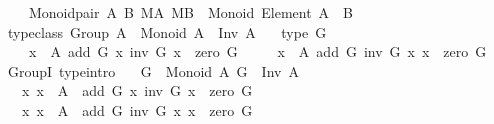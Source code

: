 \begin{isabellebody}
\ \ \ \ Monoid{\isacharunderscore}{\kern0pt}pair\ A\ B\ MA\ MB\ {\isacharcolon}{\kern0pt}\ Monoid\ {\isacharparenleft}{\kern0pt}Element\ {\isacharparenleft}{\kern0pt}A\ {\isasymtimes}\ B{\isacharparenright}{\kern0pt}{\isacharparenright}{\kern0pt}{\isachardoublequoteclose}\isanewline
%
\isadelimproof
%
\endisadelimproof
%
\isatagproof
{}\isamarkupfalse%
%
\endisatagproof
{\isafoldproof}%
%
\isadelimproof
%
\endisadelimproof
%
\isadelimdocument
%
\endisadelimdocument
%
\isatagdocument
%
\isamarkuptrue%
%
\endisatagdocument
{\isafolddocument}%
%
\isadelimdocument
%
\endisadelimdocument
{}\isamarkupfalse%
\ {\isacharbrackleft}{\kern0pt}typeclass{\isacharbrackright}{\kern0pt}{\isacharcolon}{\kern0pt}\ {\isachardoublequoteopen}Group\ A\ {\isasymequiv}\ Monoid\ A\ {\isacharampersand}{\kern0pt}\ Inv\ A\ {\isacharampersand}{\kern0pt}\isanewline
\ \ type\ {\isacharparenleft}{\kern0pt}{\isasymlambda}G{\isachardot}{\kern0pt}\isanewline
\ \ \ \ {\isacharparenleft}{\kern0pt}{\isasymforall}x\ {\isacharcolon}{\kern0pt}\ A{\isachardot}{\kern0pt}\ add\ G\ x\ {\isacharparenleft}{\kern0pt}inv\ G\ x{\isacharparenright}{\kern0pt}\ {\isacharequal}{\kern0pt}\ zero\ G{\isacharparenright}{\kern0pt}\ {\isasymand}\isanewline
\ \ \ \ {\isacharparenleft}{\kern0pt}{\isasymforall}x\ {\isacharcolon}{\kern0pt}\ A{\isachardot}{\kern0pt}\ add\ G\ {\isacharparenleft}{\kern0pt}inv\ G\ x{\isacharparenright}{\kern0pt}\ x\ {\isacharequal}{\kern0pt}\ zero\ G{\isacharparenright}{\kern0pt}{\isacharparenright}{\kern0pt}{\isachardoublequoteclose}\isanewline
\isanewline
{}\isamarkupfalse%
\ GroupI\ {\isacharbrackleft}{\kern0pt}type{\isacharunderscore}{\kern0pt}intro{\isacharbrackright}{\kern0pt}{\isacharcolon}{\kern0pt}\isanewline
\ \ \ {\isachardoublequoteopen}G\ {\isacharcolon}{\kern0pt}\ Monoid\ A{\isachardoublequoteclose}\ {\isachardoublequoteopen}G\ {\isacharcolon}{\kern0pt}\ Inv\ A{\isachardoublequoteclose}\isanewline
\ \ \ {\isachardoublequoteopen}{\isasymAnd}x{\isachardot}{\kern0pt}\ x\ {\isacharcolon}{\kern0pt}\ A\ {\isasymLongrightarrow}\ add\ G\ x\ {\isacharparenleft}{\kern0pt}inv\ G\ x{\isacharparenright}{\kern0pt}\ {\isacharequal}{\kern0pt}\ zero\ G{\isachardoublequoteclose}\isanewline
\ \ \ {\isachardoublequoteopen}{\isasymAnd}x{\isachardot}{\kern0pt}\ x\ {\isacharcolon}{\kern0pt}\ A\ {\isasymLongrightarrow}\ add\ G\ {\isacharparenleft}{\kern0pt}inv\ G\ x{\isacharparenright}{\kern0pt}\ x\ {\isacharequal}{\kern0pt}\ zero\ G{\isachardoublequoteclose}\isanewline

\end{isabellebody}
